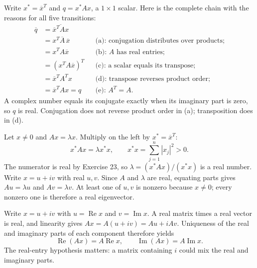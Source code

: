 Write $x^*=\overline{x}^{T}$ and $q=x^*Ax$, a $1\times1$ scalar. Here is the complete chain with the reasons for all five transitions:
\begin{align*}
\overline q
&=\overline{\overline{x}^{T}Ax}\\
&=x^T\overline A\,\overline x
&&\text{(a): conjugation distributes over products;}\\
&=x^TA\overline x
&&\text{(b): $A$ has real entries;}\\
&=(x^TA\overline x)^T
&&\text{(c): a scalar equals its transpose;}\\
&=\overline{x}^{T}A^Tx
&&\text{(d): transpose reverses product order;}\\
&=\overline{x}^{T}Ax=q
&&\text{(e): $A^T=A$.}
\end{align*}
A complex number equals its conjugate exactly when its imaginary part is zero, so $q$ is real. Conjugation does not reverse product order in (a); transposition does in (d).

Let $x\ne0$ and $Ax=\lambda x$. Multiply on the left by $x^*=\overline{x}^{T}$:
\[
x^*Ax=\lambda x^*x,\qquad
x^*x=\sum_{j=1}^n|x_j|^2>0.
\]
The numerator is real by Exercise 23, so
$\lambda=(x^*Ax)/(x^*x)$ is a real number.
Write $x=u+iv$ with real $u,v$. Since $A$ and $\lambda$ are real, equating parts gives $Au=\lambda u$ and $Av=\lambda v$. At least one of $u,v$ is nonzero because $x\ne0$; every nonzero one is therefore a real eigenvector.

Write $x=u+iv$ with $u=\operatorname{Re}x$ and $v=\operatorname{Im}x$. A real matrix times a real vector is real, and linearity gives $Ax=A(u+iv)=Au+iAv$. Uniqueness of the real and imaginary parts of each component therefore yields
\[
\operatorname{Re}(Ax)=A\operatorname{Re}x,
\qquad \operatorname{Im}(Ax)=A\operatorname{Im}x.
\]
The real-entry hypothesis matters: a matrix containing $i$ could mix the real and imaginary parts.

